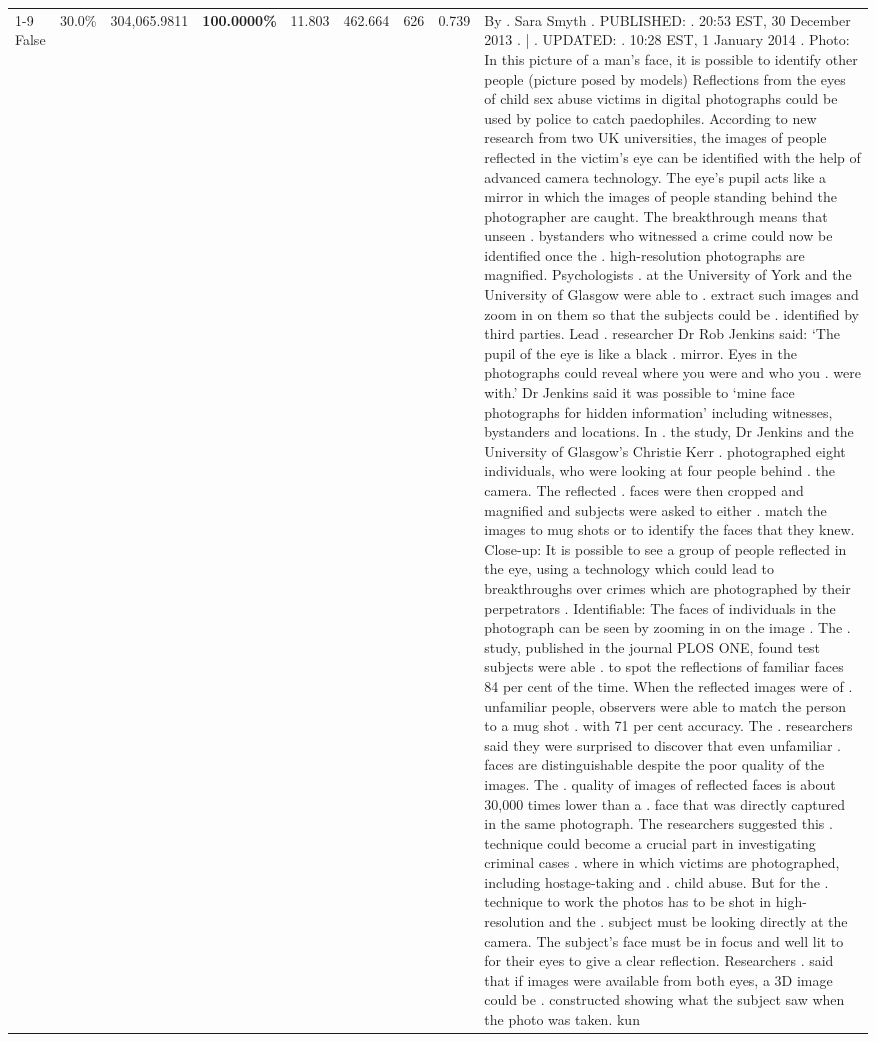 \begin{table}[H]
\begin{tabular}{lllrlllll}
\cline{1-9}
False & 30.0\% & 304,065.9811 & \bfseries \color{red} 100.0000\% & 11.803 & 462.664 & 626 & 0.739 & By . Sara Smyth . PUBLISHED: . 20:53 EST, 30 December 2013 . | . UPDATED: . 10:28 EST, 1 January 2014 . Photo: In this picture of a man's face, it is possible to identify other people (picture posed by models) Reflections from the eyes of child sex abuse victims in digital photographs could be used by police to catch paedophiles. According to new research from two UK universities, the images of people reflected in the victim's eye can be identified with the help of advanced camera technology. The eye's pupil acts like a mirror in which the images of people standing behind the photographer are caught. The breakthrough means that unseen . bystanders who witnessed a crime could now be identified once the . high-resolution photographs are magnified. Psychologists . at the University of York and the University of Glasgow were able to . extract such images and zoom in on them so that the subjects could be . identified by third parties. Lead . researcher Dr Rob Jenkins said: ‘The pupil of the eye is like a black . mirror. Eyes in the photographs could reveal where you were and who you . were with.' Dr Jenkins said it was possible to ‘mine face photographs for hidden information' including witnesses, bystanders and locations. In . the study, Dr Jenkins and the University of Glasgow's Christie Kerr . photographed eight individuals, who were looking at four people behind . the camera. The reflected . faces were then cropped and magnified and subjects were asked to either . match the images to mug shots or to identify the faces that they knew. Close-up: It is possible to see a group of people reflected in the eye, using a technology which could lead to breakthroughs over crimes which are photographed by their perpetrators . Identifiable: The faces of individuals in the photograph can be seen by zooming in on the image . The . study, published in the journal PLOS ONE, found test subjects were able . to spot the reflections of familiar faces 84 per cent of the time. When the reflected images were of . unfamiliar people, observers were able to match the person to a mug shot . with 71 per cent accuracy. The . researchers said they were surprised to discover that even unfamiliar . faces are distinguishable despite the poor quality of the images. The . quality of images of reflected faces is about 30,000 times lower than a . face that was directly captured in the same photograph. The researchers suggested this . technique could become a crucial part in investigating criminal cases . where in which victims are photographed, including hostage-taking and . child abuse. But for the . technique to work the photos has to be shot in high-resolution and the . subject must be looking directly at the camera. The subject's face must be in focus and well lit to for their eyes to give a clear reflection. Researchers . said that if images were available from both eyes, a 3D image could be . constructed showing what the subject saw when the photo was taken. kun \\

\end{tabular}
\end{table}
